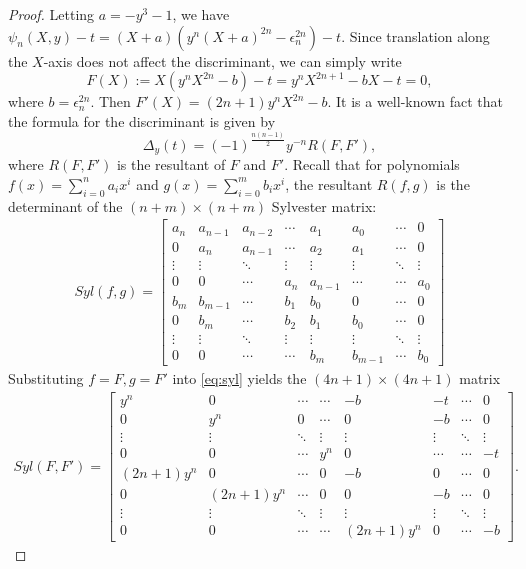 \documentclass[10pt,a4paper]{amsart}
\newcommand{\ep}{\epsilon}
\begin{document}
\begin{proof}
Letting $a=-y^3-1$, we have $\psi_n(X,y)-t=(X+a)(y^n (X+a)^{2n}-{\ep_n^{2n}})-t$.
Since translation along the $X$-axis does not affect the discriminant, we can simply write 
\[F(X):=X(y^n X^{2n}-b)-t=y^n X^{2n+1}-bX-t=0,\]
where $b={\ep_n^{2n}}$.
Then $F'(X)=(2n+1)y^n X^{2n}-b$.
It is a well-known fact that the formula for the discriminant is given by 
\[\Delta_y(t)=(-1)^{\frac{n(n-1)}{2}} y^{-n} R(F,F'),\] 
where $R(F,F')$ is the resultant of $F$ and $F'$.
Recall that for polynomials $f(x)=\sum_{i=0}^n a_i x^i$ and $g(x)=\sum_{i=0}^m b_i x^i$, 
the resultant $R(f,g)$ is the determinant of the $(n+m)\times (n+m)$ Sylvester matrix:
\begin{align}
Syl(f,g)=
\begin{bmatrix} \label{eq:syl}
a_n & a_{n-1} &a_{n-2} & \cdots &a_{1}  & a_{0} & \cdots & 0 \\
0 & a_{n} &a_{n-1} & \cdots &a_{2}  & a_{1} & \cdots & 0 \\
\vdots & \vdots &\ddots & \vdots & \vdots &\vdots & \ddots &\vdots \\
0&0&\cdots&a_n&a_{n-1}&\cdots&\cdots&a_0 \\
b_m&b_{m-1}&\cdots&b_1&b_0&0&\cdots &0 \\
0&b_{m}&\cdots&b_2&b_1&b_0&\cdots &0 \\
\vdots &\vdots &\ddots&\vdots &\vdots &\vdots &\ddots &\vdots \\
0&0&\cdots&\cdots&b_m&b_{m-1}&\cdots&b_0
\end{bmatrix}
\end{align}
Substituting $f=F, g=F'$ into \eqref{eq:syl} yields the $(4n+1)\times (4n+1)$ matrix
\begin{align*}
Syl(F,F')=
\begin{bmatrix}
y^n & 0 & \cdots & \cdots & -b  & -t & \cdots & 0 \\
0 & y^n &0 & \cdots & 0  & -b & \cdots & 0 \\
\vdots & \vdots &\ddots & \vdots & \vdots &\vdots & \ddots &\vdots \\
0&0&\cdots&y^n&0&\cdots&\cdots&-t \\
(2n+1)y^n&0&\cdots&0&-b&0&\cdots &0 \\
0&(2n+1)y^n&\cdots&0&0&-b&\cdots &0 \\
\vdots &\vdots &\ddots&\vdots &\vdots &\vdots &\ddots &\vdots \\
0&0&\cdots&\cdots&(2n+1)y^n&0&\cdots&-b
\end{bmatrix}.
\end{align*}

\end{proof}
\end{document}
